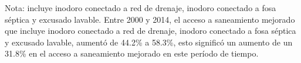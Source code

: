 Nota: incluye inodoro conectado a red de drenaje, inodoro conectado a fosa séptica y excusado lavable. Entre 2000 y 2014, el acceso a saneamiento mejorado que incluye inodoro conectado a red de drenaje, inodoro conectado a fosa séptica y excusado lavable, aumentó de 44.2\% a 58.3\%, esto significó un aumento de un 31.8\% en el acceso a saneamiento mejorado en este período de tiempo.